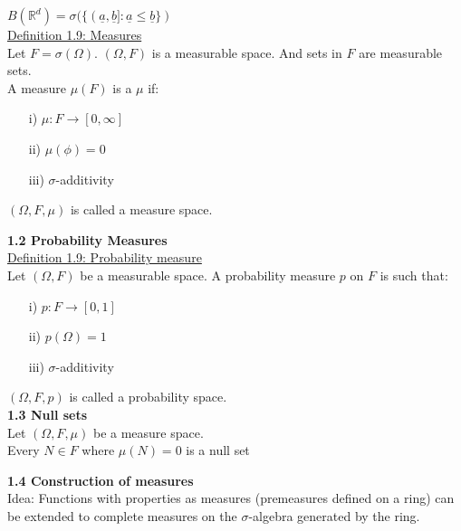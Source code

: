 \documentclass[10pt,letterpaper]{article}
\begin{document}
$B(\mathbb{R}^d) = \sigma(\{(\underline{a}, \underline{b}]: \underline{a}\leq \underline{b}\})$\\

\underline{Definition 1.9: Measures}\\

Let $F = \sigma(\Omega)$. $(\Omega, F)$ is a measurable space. And sets in $F$ are measurable sets.\\

A measure $\mu(F)$ is a $\mu$ if:

\begin{enumerate}
\item[i)] $\mu: F\rightarrow [0,\infty]$
\item[ii)] $\mu(\phi) = 0$
\item[iii)] $\sigma$-additivity
\end{enumerate}

$(\Omega, F, \mu)$ is called a measure space.\\

\pagebreak

\textbf{1.2 Probability Measures}\\

\underline{Definition 1.9: Probability measure}\\

Let $(\Omega, F)$ be a measurable space. A probability measure $p$ on $F$ is such that:

\begin{enumerate}
\item[i)] $p: F\rightarrow [0,1]$
\item[ii)] $p(\Omega) = 1$
\item[iii)] $\sigma$-additivity
\end{enumerate}

$(\Omega, F, p)$ is called a probability space.\\

\textbf{1.3 Null sets}\\

Let $(\Omega, F, \mu)$ be a measure space.\\

Every $N\in F$ where $\mu(N)=0$ is a null set\\

\pagebreak

\textbf{1.4 Construction of measures}\\

Idea: Functions with properties as measures (premeasures defined on a ring) can be extended
to complete measures on the $\sigma$-algebra generated by the ring.\\
\end{document}
